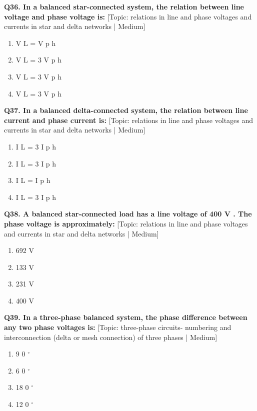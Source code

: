 \noindent\textbf{Q36. In a balanced star-connected system, the relation between line voltage and phase voltage is:} \hfill [Topic: relations in line and phase voltages and currents in star and delta networks | Medium]
\begin{enumerate}[label=(\alph*),topsep=2pt,itemsep=1pt,partopsep=0pt,parsep=0pt]
    \item {V L = V p h}
    \item {V L = 3 V p h}
    \item {V L = 3 V p h}
    \item {V L = 3 V p h}
\end{enumerate}
\vspace{2mm}

\noindent\textbf{Q37. In a balanced delta-connected system, the relation between line current and phase current is:} \hfill [Topic: relations in line and phase voltages and currents in star and delta networks | Medium]
\begin{enumerate}[label=(\alph*),topsep=2pt,itemsep=1pt,partopsep=0pt,parsep=0pt]
    \item {I L = 3 I p h}
    \item {I L = 3 I p h}
    \item {I L = I p h}
    \item {I L = 3 I p h}
\end{enumerate}
\vspace{2mm}

\noindent\textbf{Q38. A balanced star-connected load has a line voltage of 400 V . The phase voltage is approximately:} \hfill [Topic: relations in line and phase voltages and currents in star and delta networks | Medium]
\begin{enumerate}[label=(\alph*),topsep=2pt,itemsep=1pt,partopsep=0pt,parsep=0pt]
    \item {692 V}
    \item {133 V}
    \item {231 V}
    \item {400 V}
\end{enumerate}
\vspace{2mm}

\noindent\textbf{Q39. In a three-phase balanced system, the phase difference between any two phase voltages is:} \hfill [Topic: three-phase circuits- numbering and interconnection (delta or mesh connection) of three phases | Medium]
\begin{enumerate}[label=(\alph*),topsep=2pt,itemsep=1pt,partopsep=0pt,parsep=0pt]
    \item {9 0 $^\circ$}
    \item {6 0 $^\circ$}
    \item {18 0 $^\circ$}
    \item {12 0 $^\circ$}
\end{enumerate}
\vspace{2mm}

